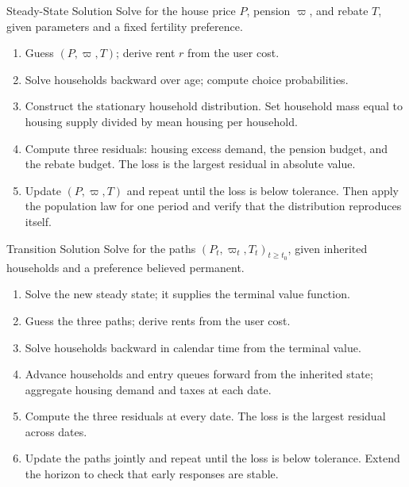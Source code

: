 \begin{frame}[label=algo-ss]{Steady-State Solution}
Solve for the house price $P$, pension $\varpi$, and rebate $T$, given parameters and a fixed fertility preference.

\medskip
\begin{enumerate}\setlength\itemsep{0.55em}
 \item Guess $(P,\varpi,T)$; derive rent $r$ from the user cost.
 \item Solve households backward over age; compute choice probabilities.
 \item Construct the stationary household distribution. Set household mass equal to housing supply divided by mean housing per household.
 \item Compute three residuals: housing excess demand, the pension budget, and the rebate budget. The loss is the largest residual in absolute value.
 \item Update $(P,\varpi,T)$ and repeat until the loss is below tolerance. Then apply the population law for one period and verify that the distribution reproduces itself.
\end{enumerate}
\end{frame}

\begin{frame}[label=algo-transition]{Transition Solution}
Solve for the paths $(P_t,\varpi_t,T_t)_{t\ge t_0}$, given inherited households and a preference believed permanent.

\medskip
\begin{enumerate}\setlength\itemsep{0.4em}
 \item Solve the new steady state; it supplies the terminal value function.
 \item Guess the three paths; derive rents from the user cost.
 \item Solve households backward in calendar time from the terminal value.
 \item Advance households and entry queues forward from the inherited state; aggregate housing demand and taxes at each date.
 \item Compute the three residuals at every date. The loss is the largest residual across dates.
 \item Update the paths jointly and repeat until the loss is below tolerance. Extend the horizon to check that early responses are stable.
\end{enumerate}
\end{frame}
